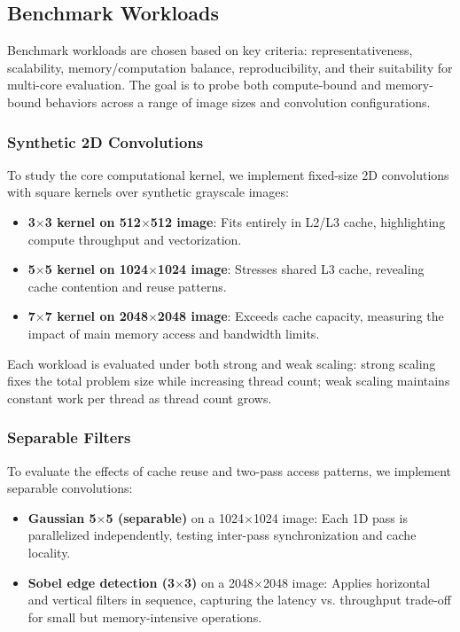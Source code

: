 \documentclass[conference, 10pt]{IEEEtran}
\begin{document}
\subsection{Benchmark Workloads}

Benchmark workloads are chosen based on key criteria: representativeness, scalability, memory/computation balance, reproducibility, and their suitability for multi-core evaluation. The goal is to probe both compute-bound and memory-bound behaviors across a range of image sizes and convolution configurations.

\subsubsection{Synthetic 2D Convolutions}

To study the core computational kernel, we implement fixed-size 2D convolutions with square kernels over synthetic grayscale images:

\begin{itemize}
    \item \textbf{3$\times$3 kernel on 512$\times$512 image}: Fits entirely in L2/L3 cache, highlighting compute throughput and vectorization.
    \item \textbf{5$\times$5 kernel on 1024$\times$1024 image}: Stresses shared L3 cache, revealing cache contention and reuse patterns.
    \item \textbf{7$\times$7 kernel on 2048$\times$2048 image}: Exceeds cache capacity, measuring the impact of main memory access and bandwidth limits.
\end{itemize}

Each workload is evaluated under both strong and weak scaling: strong scaling fixes the total problem size while increasing thread count; weak scaling maintains constant work per thread as thread count grows.

\subsubsection{Separable Filters}

To evaluate the effects of cache reuse and two-pass access patterns, we implement separable convolutions:

\begin{itemize}
    \item \textbf{Gaussian 5$\times$5 (separable)} on a 1024$\times$1024 image: Each 1D pass is parallelized independently, testing inter-pass synchronization and cache locality.
    \item \textbf{Sobel edge detection (3$\times$3)} on a 2048$\times$2048 image: Applies horizontal and vertical filters in sequence, capturing the latency vs. throughput trade-off for small but memory-intensive operations.
\end{itemize}
\end{document}

